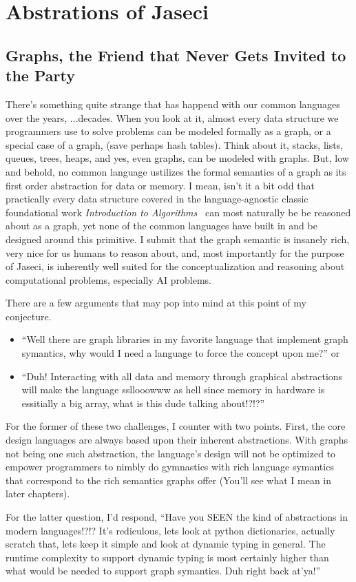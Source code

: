 \chapter{Abstrations of Jaseci}
\minitoc
\section{Graphs, the Friend that Never Gets Invited to the Party}
There's something quite strange that has happend with our \gls{common languages} over the years, ...decades. When you look at it, almost every data structure we programmers use to solve problems can be modeled formally as a graph, or a special case of a graph, (save perhaps hash tables). Think about it, stacks, lists, queues, trees, heaps, and yes, even graphs, can be modeled with graphs. But, low and behold, no common language ustilizes the formal semantics of a graph as its first order abstraction for data or memory. I mean, isn't it a bit odd that practically every data structure covered in the language-agnostic classic foundational work \textit{Introduction to Algorithms}~\cite{intro_to_algo} can most naturally be be reasoned about as a graph, yet none of the common languages have built in and be designed around this primitive. I submit that the graph semantic is insanely rich, very nice for us humans to reason about, and, most importantly for the purpose of Jaseci, is inherently well suited for the conceptualization and reasoning about computational problems, especially AI problems.
\par
There are a few arguments that may pop into mind at this point of my conjecture.
\begin{itemize}
    \item ``Well there are graph libraries in my favorite language that implement graph symantics, why would I need a language to force the concept upon me?''
          or
    \item ``Duh! Interacting with all data and memory through graphical abstractions will make the language ssllooowww as hell since memory in hardware is essitially a big array, what is this dude talking about!?!?''
\end{itemize}
\par
For the former of these two challenges, I counter with two points. First, the core design languages are always based upon their inherent abstractions. With graphs not being one such abstraction, the language's design will not be optimized to empower programmers to nimbly do gymnastics with rich language symantics that correspond to the rich semantics graphs offer (You'll see what I mean in later chapters).
\par
For the latter question, I'd respond, ``Have you SEEN the kind of abstractions in modern languages!?!? It's rediculous, lets look at python dictionaries, actually scratch that, lets keep it simple and look at dynamic typing in general. The runtime complexity to support dynamic typing is most certainly higher than what would be needed to support graph symantics. Duh right back at'ya!''

